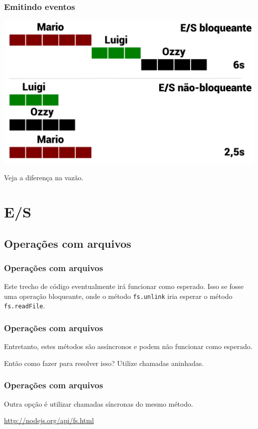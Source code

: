 \begin{frame}\frametitle{Emitindo eventos}

\includegraphics[scale=0.35]{img/throughput.png}

Veja a diferença na vazão.

\end{frame}

\begin{frame}\frametitle{}


\end{frame}

\section{E/S}

\subsection{Operações com arquivos}

\begin{frame}[fragile]\frametitle{Operações com arquivos}


Este trecho de código eventualmente irá funcionar como esperado. Isso se
fosse uma operação bloqueante, onde o método \texttt{fs.unlink} iria
esperar o método \texttt{fs.readFile}.

\end{frame}

\begin{frame}\frametitle{Operações com arquivos}

Entretanto, estes métodos são assíncronos e podem não funcionar como
esperado.

Então como fazer para resolver isso? Utilize chamadas aninhadas.


\end{frame}

\begin{frame}[fragile]\frametitle{Operações com arquivos}

Outra opção é utilizar chamadas síncronas do mesmo método.


\url{http://nodejs.org/api/fs.html}

\end{frame}

